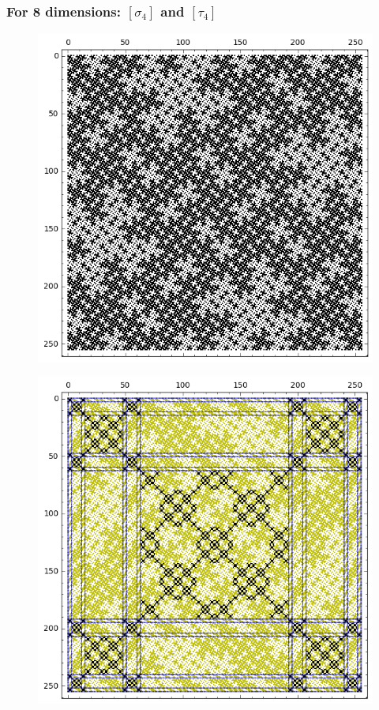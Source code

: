 \documentclass[pdf,sprung,slideColor,nocolorBG]{beamer}
\newenvironment{colortheme}[1]{
\def\ProvidesPackageRCS $##1${\relax}
\renewcommand{\ProcessOptions}{\relax}
\makeatletter

\makeatother
}{}
\begin{document}
\begin{colortheme}{jubata}
\begin{frame}
\begin{figure}
\begin{minipage}{.48\textwidth}
  \label{fig:tau_3_bent_cayley_graph_index_matrix}
\end{minipage}
\end{figure}
\end{frame}

\begin{frame}
\frametitle{For 8 dimensions: $[\sigma_4]$ and $[\tau_4]$}
\begin{figure}
\centering
\begin{minipage}{.48\textwidth}
  \centering
  \includegraphics[width=.9\linewidth]{../matrix_plot/sigma_4_bent_cayley_graph_index_matrix.png}
  \label{fig:sigma_4_bent_cayley_graph_index_matrix}
\end{minipage}%
\begin{minipage}{.48\textwidth}
  \centering
  \includegraphics[width=.9\linewidth]{../matrix_plot/tau_4_bent_cayley_graph_index_matrix.png}

\end{minipage}
\end{figure}
\end{frame}
\end{colortheme}
\end{document}
